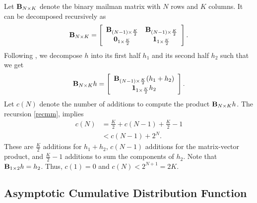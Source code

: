 \documentclass[twocolumn]{IEEEtran}
\begin{document}
Let $\mathbf{B}_{N\times K}$ denote the binary mailman matrix with $N$ rows and $K$ columns.
It can be decomposed recursively as 
\begin{align}
\mathbf{B}_{N\times K} = \left[\begin{array}{cc}
\mathbf{B}_{(N-1)\times \frac K2} & \mathbf{B}_{(N-1)\times \frac K2}\\
\mathbf 0_{1\times \frac K2} & \mathbf 1_{1\times \frac K2}
\end{array}\right].
\end{align}
Following \cite{liberty:09}, we decompose $h$ into its first half $h_1$ and its second half $h_2$ such that we get
\begin{align}
\label{recmm}
\mathbf{B}_{N\times K} h = \left[
\begin{array}{c}
\mathbf{B}_{(N-1)\times \frac K2} (h_1 + h_2)\\
\mathbf 1_{1\times \frac K2} h_2
\end{array}\right] .
\end{align}
Let $c(N)$ denote the number of additions to compute the product $\mathbf{B}_{N\times K} h$.
The recursion \eqref{recmm}, implies
\begin{align}
c(N) & = \frac K2 + c(N-1)+ \frac K2 - 1\\
& < c(N-1) + 2^N.
\end{align}
These are $\frac K2$ additions for $h_1+h_2$, $c(N-1)$ additions for the matrix-vector product, and $\frac K2-1$ additions to sum the components of $h_2$.
Note that $\mathbf{B}_{1\times 2}h = h_2$. Thus, $c(1)=0$ and $c(N) < 2^{N+1}=2K$.
 
\subsection*{Asymptotic Cumulative Distribution Function}
\end{document}
